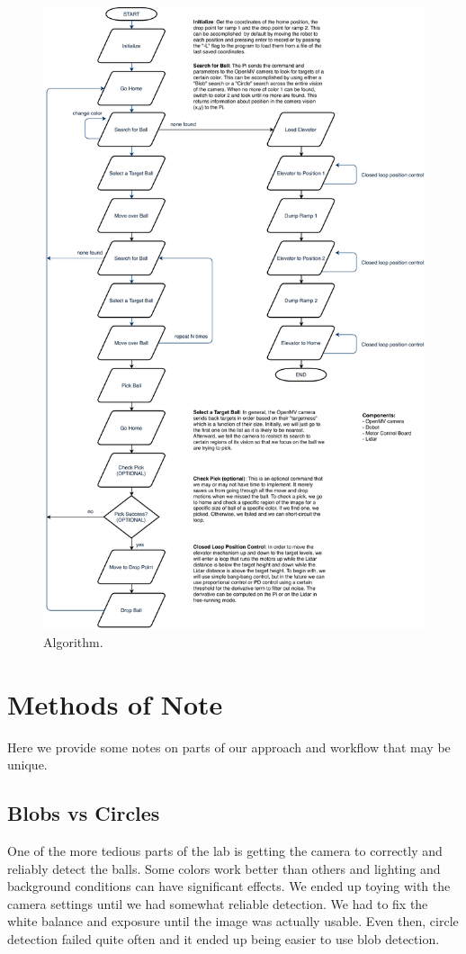 \documentclass{article}
\begin{document}
\begin{figure}[H]
		\centering
		\includegraphics[keepaspectratio,height=\textheight]{SP_project_flowchart.pdf}
		\caption{Algorithm.}
\end{figure}

\section{Methods of Note}
Here we provide some notes on parts of our approach and workflow that may be unique.

\subsection{Blobs vs Circles}
One of the more tedious parts of the lab is getting the camera to correctly and reliably detect the balls. Some colors work better than others and lighting and background conditions can have significant effects. We ended up toying with the camera settings until we had somewhat reliable detection. We had to fix the white balance and exposure until the image was actually usable. Even then, circle detection failed quite often and it ended up being easier to use blob detection.
\end{document}
